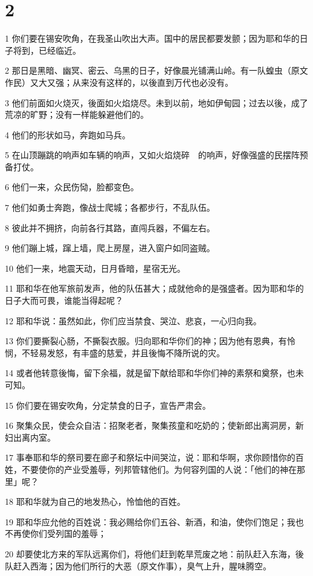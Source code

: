 \chapter{2}

\par 1 你们要在锡安吹角，在我圣山吹出大声。国中的居民都要发颤；因为耶和华的日子将到，已经临近。
\par 2 那日是黑暗、幽冥、密云、乌黑的日子，好像晨光铺满山岭。有一队蝗虫（原文作民）又大又强；从来没有这样的，以後直到万代也必没有。
\par 3 他们前面如火烧灭，後面如火焰烧尽。未到以前，地如伊甸园；过去以後，成了荒凉的旷野；没有一样能躲避他们的。
\par 4 他们的形状如马，奔跑如马兵。
\par 5 在山顶蹦跳的响声如车辆的响声，又如火焰烧碎　的响声，好像强盛的民摆阵预备打仗。
\par 6 他们一来，众民伤恸，脸都变色。
\par 7 他们如勇士奔跑，像战士爬城；各都步行，不乱队伍。
\par 8 彼此并不拥挤，向前各行其路，直闯兵器，不偏左右。
\par 9 他们蹦上城，蹿上墙，爬上房屋，进入窗户如同盗贼。
\par 10 他们一来，地震天动，日月昏暗，星宿无光。
\par 11 耶和华在他军旅前发声，他的队伍甚大；成就他命的是强盛者。因为耶和华的日子大而可畏，谁能当得起呢？
\par 12 耶和华说：虽然如此，你们应当禁食、哭泣、悲哀，一心归向我。
\par 13 你们要撕裂心肠，不撕裂衣服。归向耶和华你们的神；因为他有恩典，有怜悯，不轻易发怒，有丰盛的慈爱，并且後悔不降所说的灾。
\par 14 或者他转意後悔，留下余福，就是留下献给耶和华你们神的素祭和奠祭，也未可知。
\par 15 你们要在锡安吹角，分定禁食的日子，宣告严肃会。
\par 16 聚集众民，使会众自洁：招聚老者，聚集孩童和吃奶的；使新郎出离洞房，新妇出离内室。
\par 17 事奉耶和华的祭司要在廊子和祭坛中间哭泣，说：耶和华啊，求你顾惜你的百姓，不要使你的产业受羞辱，列邦管辖他们。为何容列国的人说：「他们的神在那里」呢？
\par 18 耶和华就为自己的地发热心，怜恤他的百姓。
\par 19 耶和华应允他的百姓说：我必赐给你们五谷、新酒，和油，使你们饱足；我也不再使你们受列国的羞辱；
\par 20 却要使北方来的军队远离你们，将他们赶到乾旱荒废之地：前队赶入东海，後队赶入西海；因为他们所行的大恶（原文作事），臭气上升，腥味腾空。
